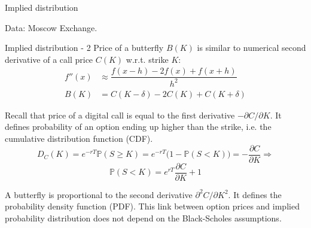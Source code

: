 \documentclass{beamer}
\begin{document}
\begin{frame}{Implied distribution}
\centering
{}

\scriptsize Data: Moscow Exchange.
\end{frame}



\begin{frame}{Implied distribution - 2}
\justify
Price of a butterfly $B(K)$ is similar to numerical second derivative of a call price $C(K)$ w.r.t. strike $K$:
\begin{align*}
f''(x) &\approx \dfrac{f(x - h) - 2f(x) + f(x+h)}{h^2} \\
B(K) &= C(K-\delta) - 2C(K) + C(K+\delta)
\end{align*}

\justify
Recall that price of a digital call is equal to the first derivative $-\partial C/\partial K$. It defines probability of an option ending up higher than the strike, i.e. the \alert{cumulative distribution function (CDF)}.
\begin{equation*}
D_C(K) = e^{-rT}\mathbb{P}(S \ge K) = e^{-rT}\Big(1 - \mathbb{P}(S < K)\Big) = -\dfrac{\partial C}{\partial K} \Rightarrow
\end{equation*}
\begin{equation*}
\mathbb{P}(S < K) = e^{rT}\dfrac{\partial C}{\partial K} + 1
\end{equation*}

\justify
A butterfly is proportional to the second derivative $\partial^2C/\partial K^2$. It defines the \alert{probability density function (PDF)}. This link between option prices and implied probability distribution does not depend on the Black-Scholes assumptions.
\end{frame}
\end{document}
